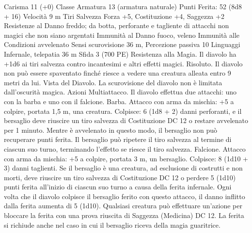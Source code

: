 \begin{multicols}{2}
Carisma 11 (+0)
Classe Armatura 13 (armatura naturale)
\hspace*{0pt}\hfill{Punti Ferita}: 52 (8d8 + 16)
Velocità 9 m
Tiri Salvezza Forza +5, Costituzione +4, Saggezza +2
Resistenze al Danno freddo; da botta, perforante e tagliente
di attacchi non magici che non siano argentati
Immunità al Danno fuoco, veleno
Immunità alle Condizioni avvelenato
Sensi scurovisione 36 m, Percezione passiva 10
Linguaggi Infernale, telepatia 36 m
Sfida 3 (700 PE)
Resistenza alla Magia. Il diavolo ha +1d6 ai tiri salvezza
contro incantesimi e altri effetti magici.
Risoluto. Il diavolo non può essere spaventato finché riesce a
vedere una creatura alleata entro 9 metri da lui.
Vista del Diavolo. La scurovisione del diavolo non è limitata
dall’oscurità magica.
Azioni
Multiattacco. Il diavolo effettua due attacchi: uno con la barba e
uno con il falcione.
Barba. Attacco con arma da mischia: +5 a colpire, portata 1,5 m,
una creatura.
Colpisce: 6 (1d8 + 2) danni perforanti, e il bersaglio deve
riuscire un tiro salvezza di Costituzione DC 12 o restare
avvelenato per 1 minuto. Mentre è avvelenato in questo modo, il
bersaglio non può recuperare punti ferita. Il bersaglio può
ripetere il tiro salvezza al termine di ciascun suo turno,
terminando l’effetto se riesce il tiro salvezza.
Falcione. Attacco con arma da mischia: +5 a colpire, portata 3
m, un bersaglio.
Colpisce: 8 (1d10 + 3) danni taglienti. Se il bersaglio è una
creatura, ad esclusione di costrutti e non morti, deve riuscire un
tiro salvezza di Costituzione DC 12 o perdere 5 (1d10) punti
ferita all’inizio di ciascun suo turno a causa della ferita infernale.
Ogni volta che il diavolo colpisce il bersaglio ferito con questo
attacco, il danno inflitto dalla ferita aumenta di 5 (1d10).
Qualsiasi creatura può effettuare un’azione per bloccare la ferita
con una prova riuscita di Saggezza (Medicina) DC 12. La ferita
si richiude anche nel caso in cui il bersaglio riceva della magia
guaritrice. 
 

\end{multicols}

